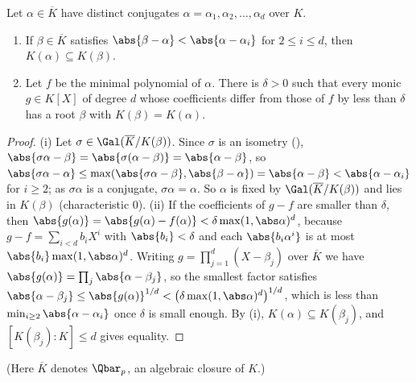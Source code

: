 \begin{lemma}[Krasner]\label{lem:local:krasner}
Let $\alpha\in\overline K$ have distinct conjugates $\alpha=\alpha_1,\alpha_2,\dots,\alpha_d$ over $K$.
\begin{enumerate}[label=(\roman*)]
\item If $\beta\in\overline K$ satisfies $\abs{\beta-\alpha}<\abs{\alpha-\alpha_i}$ for $2\le i\le d$, then $K(\alpha)\subseteq K(\beta)$.
\item Let $f$ be the minimal polynomial of $\alpha$. There is $\delta>0$ such that every monic $g\in K[X]$ of degree $d$ whose coefficients differ from
those of $f$ by less than $\delta$ has a root $\beta$ with $K(\beta)=K(\alpha)$.
\end{enumerate}
\end{lemma}

\begin{proof}
(i) Let $\sigma\in\Gal(\overline K/K(\beta))$. Since $\sigma$ is an isometry (), $\abs{\sigma\alpha-\beta}=\abs{\sigma(\alpha-\beta)}=\abs{\alpha-\beta}$, so
$\abs{\sigma\alpha-\alpha}\le\max(\abs{\sigma\alpha-\beta},\abs{\beta-\alpha})=\abs{\alpha-\beta}<\abs{\alpha-\alpha_i}$ for $i\ge2$; as $\sigma\alpha$ is a conjugate, $\sigma\alpha=\alpha$.
So $\alpha$ is fixed by $\Gal(\overline K/K(\beta))$ and lies in $K(\beta)$ (characteristic $0$). (ii) If the coefficients of $g-f$ are smaller than $\delta$,
then $\abs{g(\alpha)}=\abs{g(\alpha)-f(\alpha)}<\delta\max(1,\abs\alpha)^d$, because $g-f=\sum_{i<d}b_iX^i$ with $\abs{b_i}<\delta$ and each
$\abs{b_i\alpha^i}$ is at most $\abs{b_i}\max(1,\abs\alpha)^d$. Writing $g=\prod_{j=1}^d(X-\beta_j)$ over $\overline K$ we have
$\abs{g(\alpha)}=\prod_j\abs{\alpha-\beta_j}$, so the smallest factor satisfies $\abs{\alpha-\beta_j}\le\abs{g(\alpha)}^{1/d}<\bigl(\delta\max(1,\abs\alpha)^d\bigr)^{1/d}$,
which is less than $\min_{i\ge2}\abs{\alpha-\alpha_i}$ once $\delta$ is small enough. By (i), $K(\alpha)\subseteq K(\beta_j)$, and $[K(\beta_j):K]\le d$ gives equality.
\end{proof}

(Here $\overline K$ denotes $\Qbar_p$, an algebraic closure of $K$.)

